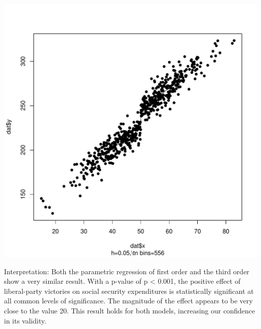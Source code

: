 \documentclass[12pt]{article}\usepackage[]{graphicx}\usepackage[]{color}
\makeatletter
\def\maxwidth{ %
  \ifdim\Gin@nat@width>\linewidth
    \linewidth
  \else
    \Gin@nat@width
  \fi
}
\newenvironment{knitrout}{}{} %
\makeatother
\begin{document}
\begin{knitrout}
\includegraphics[width=\maxwidth]{figure/unnamed-chunk-11-3} 

\end{knitrout}

Interpretation: Both the parametric regression of first order and the third order show a very similar result. With a p-value of p < 0.001, the positive effect of liberal-party victories on social security expenditures is statistically significant at all common levels of significance. The magnitude of the effect appears to be very close to the value 20. This result holds for both models, increasing our confidence in its validity.
\end{document}
